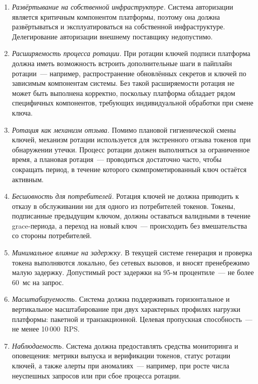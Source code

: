 \begin{enumerate}
  \item \emph{Развёртывание на собственной инфраструктуре.}
    Система авторизации является критичным компонентом платформы,
    поэтому она должна развёртываться и эксплуатироваться на собственной инфраструктуре.
    Делегирование авторизации внешнему поставщику недопустимо.

  \item \emph{Расширяемость процесса ротации.}
    При ротации ключей подписи платформа должна иметь возможность
    встроить дополнительные шаги в пайплайн ротации~---
    например, распространение обновлённых секретов и ключей
    по зависимым компонентам системы.
    Без такой расширяемости ротация не может быть выполнена корректно,
    поскольку платформа обладает рядом специфичных компонентов,
    требующих индивидуальной обработки при смене ключа.

  \item \emph{Ротация как механизм отзыва.}
    Помимо плановой гигиенической смены ключей,
    механизм ротации используется для экстренного отзыва токенов
    при обнаружении утечки.
    Процесс ротации должен выполняться за ограниченное время,
    а плановая ротация~--- проводиться достаточно часто,
    чтобы сокращать период, в течение которого скомпрометированный ключ остаётся активным.

  \item \emph{Бесшовность для потребителей.}
    Ротация ключей не должна приводить к отказу в обслуживании
    ни для одного из потребителей токенов.
    Токены, подписанные предыдущим ключом,
    должны оставаться валидными в течение grace-периода,
    а переход на новый ключ~--- происходить без вмешательства со стороны потребителей.

  \item \emph{Минимальное влияние на задержку.}
    В текущей системе генерация и проверка токена выполняются локально,
    без сетевых вызовов, и вносят пренебрежимо малую задержку.
    Допустимый рост задержки на 95-м процентиле~---
    не более 60~мс на запрос.

  \item \emph{Масштабируемость.}
    Система должна поддерживать горизонтальное и вертикальное масштабирование
    при двух характерных профилях нагрузки платформы:
    пакетной и транзакционной.
    Целевая пропускная способность~--- не менее 10\,000~RPS.

  \item \emph{Наблюдаемость.}
    Система должна предоставлять средства мониторинга и оповещения:
    метрики выпуска и верификации токенов,
    статус ротации ключей,
    а также алерты при аномалиях~---
    например, при росте числа неуспешных запросов
    или при сбое процесса ротации.
\end{enumerate}

